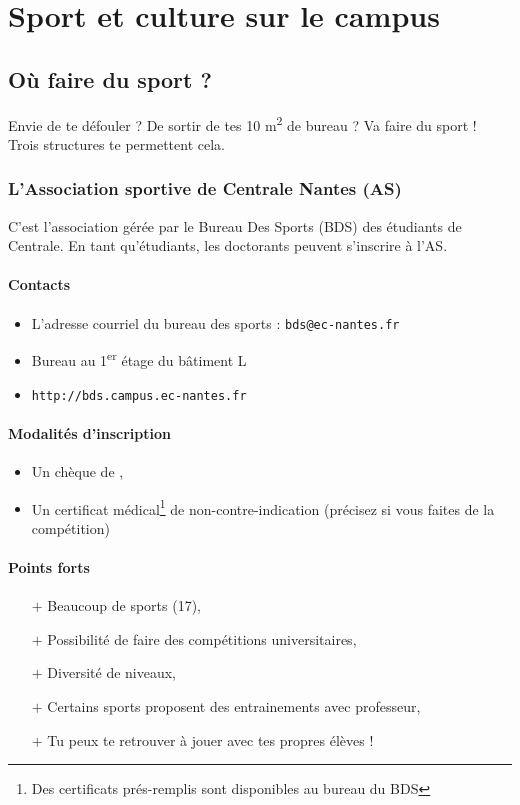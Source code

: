 \section{Sport et culture sur le campus}\trad
{}
\subsection{Où faire du sport ?}\trad
Envie de te défouler ? De sortir de tes 10 m\textsuperscript{2} de bureau ?
Va faire du sport ! Trois structures te permettent cela.

\subsubsection{L'Association sportive de Centrale Nantes (AS)}
C'est l'association gérée par le Bureau Des Sports (BDS) des étudiants de Centrale. En tant qu'étudiants, les doctorants peuvent s'inscrire à l'AS.
\paragraph{Contacts}
\begin{itemize}
  \item L'adresse courriel du bureau des sports : \texttt{bds@ec-nantes.fr}
  \item Bureau au 1\textsuperscript{er} étage du bâtiment L
  \item \texttt{http://bds.campus.ec-nantes.fr}
\end{itemize}
\paragraph{Modalités d'inscription}
\begin{itemize}
  \item Un chèque de ,
  \item Un certificat médical\footnote{Des certificats prés-remplis sont disponibles au bureau du BDS} de non-contre-indication (précisez si vous faites de la compétition)
\end{itemize}

\paragraph{Points forts}
\begin{itemize}
  \item[$+$] Beaucoup de sports (17),
  \item[$+$] Possibilité de faire des compétitions universitaires,
  \item[$+$] Diversité de niveaux,
  \item[$+$] Certains sports proposent des entrainements avec professeur,
  \item[$+$] Tu peux te retrouver à jouer avec tes propres élèves !
\end{itemize}
